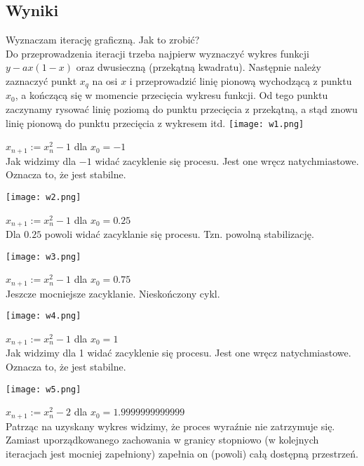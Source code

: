\documentclass{article}
\begin{document}
\begin{center}
    \subsection{Wyniki}
    \large Wyznaczam iterację graficzną. Jak to zrobić? \\
    Do przeprowadzenia iteracji trzeba najpierw wyznaczyć wykres funkcji \(y - ax(1 - x)\) oraz dwusieczną (przekątną kwadratu). 
    Następnie należy zaznaczyć punkt \(x_{q}\) na osi \(x\) i przeprowadzić linię pionową wychodzącą z punktu \(x_{0}\),
    a kończącą się w momencie przecięcia wykresu funkcji. Od tego punktu zaczynamy rysować linię poziomą do punktu przecięcia z przekątną,
    a stąd znowu linię pionową do punktu przecięcia z wykresem itd.
    \texttt{[image: w1.png]}
    \begin{center}
        \(x_{n+1}:=x_{n}^2-1\) dla \(x_{0}=-1\) \\
        Jak widzimy dla \(-1\) widać zacyklenie się procesu.
        Jest one wręcz natychmiastowe. Oznacza to, że jest stabilne.
    \end{center}
    \newpage
    \texttt{[image: w2.png]}
    \begin{center}
        \(x_{n+1}:=x_{n}^2-1\) dla \(x_{0}=0.25\) \\
        Dla \(0.25\) powoli widać zacyklanie się procesu. Tzn. powolną stabilizację.
    \end{center}
    \newpage
    \texttt{[image: w3.png]}
    \begin{center}
        \(x_{n+1}:=x_{n}^2-1\) dla \(x_{0}=0.75\) \\
        Jeszcze mocniejsze zacyklanie. Nieskończony cykl.
    \end{center}
    \newpage
    \texttt{[image: w4.png]}
    \begin{center}
        \(x_{n+1}:=x_{n}^2-1\) dla \(x_{0}=1\) \\
        Jak widzimy dla 1 widać zacyklenie się procesu.
        Jest one wręcz natychmiastowe. Oznacza to, że jest stabilne.
    \end{center}
    \newpage
    \texttt{[image: w5.png]}
    \begin{center}
        \(x_{n+1}:=x_{n}^2-2\) dla \(x_{0}=1.9999999999999\) \\
        Patrząc na uzyskany wykres widzimy, że proces wyraźnie nie zatrzymuje się.
        Zamiast uporządkowanego zachowania w granicy stopniowo 
        (w kolejnych iteracjach jest mocniej zapełniony) zapełnia on (powoli) całą dostępną przestrzeń.

\end{center}
\end{center}
\end{document}
